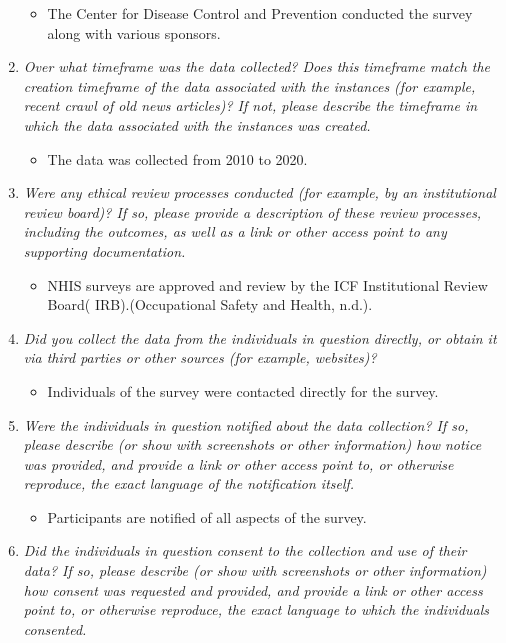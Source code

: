 \documentclass[
]{article}
\providecommand{\tightlist}{%
  \setlength{\itemsep}{0pt}\setlength{\parskip}{0pt}}
\begin{document}
\begin{enumerate}
  \begin{itemize}
  \tightlist
  \item
    The Center for Disease Control and Prevention conducted the survey along with various sponsors.
  \end{itemize}
\item
  \emph{Over what timeframe was the data collected? Does this timeframe match the creation timeframe of the data associated with the instances (for example, recent crawl of old news articles)? If not, please describe the timeframe in which the data associated with the instances was created.}

  \begin{itemize}
  \tightlist
  \item
    The data was collected from 2010 to 2020.
  \end{itemize}
\item
  \emph{Were any ethical review processes conducted (for example, by an institutional review board)? If so, please provide a description of these review processes, including the outcomes, as well as a link or other access point to any supporting documentation.}

  \begin{itemize}
  \tightlist
  \item
    NHIS surveys are approved and review by the ICF Institutional Review Board( IRB).(Occupational Safety and Health, n.d.).
  \end{itemize}
\item
  \emph{Did you collect the data from the individuals in question directly, or obtain it via third parties or other sources (for example, websites)?}

  \begin{itemize}
  \tightlist
  \item
    Individuals of the survey were contacted directly for the survey.
  \end{itemize}
\item
  \emph{Were the individuals in question notified about the data collection? If so, please describe (or show with screenshots or other information) how notice was provided, and provide a link or other access point to, or otherwise reproduce, the exact language of the notification itself.}

  \begin{itemize}
  \tightlist
  \item
    Participants are notified of all aspects of the survey.
  \end{itemize}
\item
  \emph{Did the individuals in question consent to the collection and use of their data? If so, please describe (or show with screenshots or other information) how consent was requested and provided, and provide a link or other access point to, or otherwise reproduce, the exact language to which the individuals consented.}


\end{enumerate}
\end{document}
